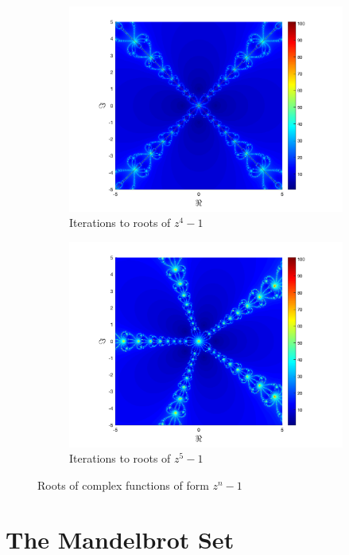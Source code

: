 \documentclass[letterpaper,11pt]{article}
\begin{document}
\begin{figure}
	\begin{subfigure}[b]{\fwidth}
		\includegraphics[width=\textwidth]{../Figures/Newton3.png}
		\caption{Iterations to roots of $z^4 - 1$}
		\label{fig:NI4}
	\end{subfigure}
	\begin{subfigure}[b]{\fwidth}
		\includegraphics[width=\textwidth]{../Figures/Newton4.png}
		\caption{Iterations to roots of $z^5 - 1$}
		\label{fig:NI5}
	\end{subfigure}
	\caption{Roots of complex functions of form $z^n - 1$}
	\label{fig:NI}
\end{figure}

\section{The Mandelbrot Set}
\end{document}
